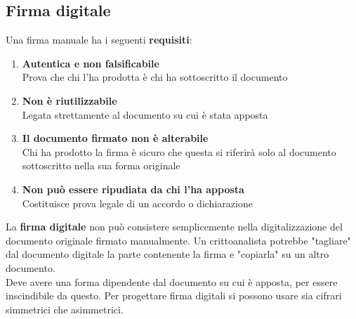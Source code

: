 \documentclass[10pt]{book}
\begin{document}
\subsection{Firma digitale}
Una firma manuale ha i seguenti \textbf{requisiti}:
\begin{enumerate}
	\item \textbf{Autentica e non falsificabile}\\
	Prova che chi l'ha prodotta è chi ha sottoscritto il documento
	\item \textbf{Non è riutilizzabile}\\
	Legata strettamente al documento su cui è stata apposta
	\item \textbf{Il documento firmato non è alterabile}\\
	Chi ha prodotto la firma è sicuro che questa si riferirà solo al documento sottoscritto nella sua forma originale
	\item \textbf{Non può essere ripudiata da chi l'ha apposta}\\
	Costituisce prova legale di un accordo o dichiarazione
\end{enumerate}
La \textbf{firma digitale} non può consistere semplicemente nella digitalizzazione del documento originale firmato manualmente. Un crittoanalista potrebbe "tagliare" dal documento digitale la parte contenente la firma e "copiarla" su un altro documento.\\
Deve avere una forma dipendente dal documento su cui è apposta, per essere inscindibile da questo. Per progettare firma digitali si possono usare sia cifrari simmetrici che asimmetrici.
\end{document}

